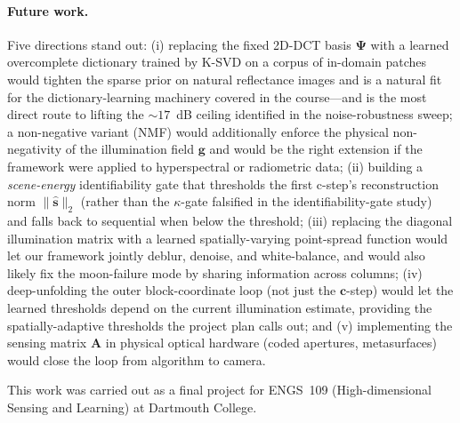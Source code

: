 \documentclass{article}
\begin{document}
\paragraph{Future work.} Five directions stand out: (i) replacing the fixed 2D-DCT basis $\boldsymbol{\Psi}$ with a learned overcomplete dictionary trained by K-SVD on a corpus of in-domain patches~\citep{elad2010sparse} would tighten the sparse prior on natural reflectance images and is a natural fit for the dictionary-learning machinery covered in the course---and is the most direct route to lifting the $\sim 17$~dB ceiling identified in the noise-robustness sweep; a non-negative variant (NMF) would additionally enforce the physical non-negativity of the illumination field $\boldsymbol{g}$ and would be the right extension if the framework were applied to hyperspectral or radiometric data; (ii) building a \emph{scene-energy} identifiability gate that thresholds the first c-step's reconstruction norm $\|\hat{\boldsymbol{s}}\|_2$ (rather than the $\kappa$-gate falsified in the identifiability-gate study) and falls back to sequential when below the threshold; (iii) replacing the diagonal illumination matrix with a learned spatially-varying point-spread function would let our framework jointly deblur, denoise, and white-balance, and would also likely fix the moon-failure mode by sharing information across columns; (iv) deep-unfolding the outer block-coordinate loop (not just the $\boldsymbol{c}$-step) would let the learned thresholds depend on the current illumination estimate, providing the spatially-adaptive thresholds the project plan calls out; and (v) implementing the sensing matrix $\boldsymbol{A}$ in physical optical hardware (coded apertures, metasurfaces) would close the loop from algorithm to camera.

\begin{ack}
  This work was carried out as a final project for ENGS~109 (High-dimensional Sensing and Learning) at Dartmouth College.
\end{ack}
\end{document}
